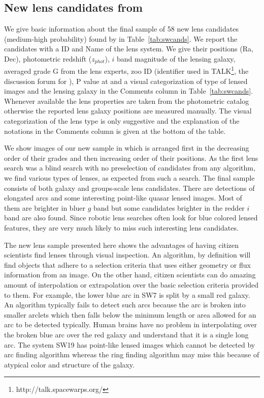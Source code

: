 \documentclass[useAMS,usenatbib,a4paper]{mn2e}
\begin{document}

\subsection{New lens candidates from \sw}
\label{sec:results:newcand}

We give basic information about the final sample of 58 new lens
candidates (medium-high probability) found by \sw in
Table~\ref{tab:swcands}. We report the candidates with a \sw ID and Name of the
lens system. We give their positions (Ra, Dec), photometric redshift
($z_{phot}$), $i$ band magnitude of the lensing galaxy, averaged grade G from
the lens experts, zoo ID (identifier used in
TALK\footnote{http://talk.spacewarps.org/}, the discussion forum for \sw), P
value at \StageTwo and a visual categorization of type of lensed images and the
lensing galaxy in the Comments column in Table~\ref{tab:swcands}. Whenever
available the lens properties are taken from the \cfhtls photometric catalog
\citep{Coupon2009} otherwise the reported lens galaxy positions are measured
manually. The visual categorization of the lens type is only suggestive and the
explanation of the notations in the Comments column is given at the bottom of
the table.

We show images of our new sample in  which is arranged
first in the decreasing order of their grades and then increasing order
of their positions. As the first lens search was a blind search with no
preselection of candidates from any algorithm, we find various types of
lenses, as expected from such a search. The final sample consists of both
galaxy and groups-scale lens candidates. There are detections of
elongated arcs and some interesting point-like quasar lensed images.
Most of them are brighter in bluer $g$ band but some candidates brighter
in the redder $i$ band are also found. Since robotic lens searches
often look for blue colored lensed features, they are very much likely
to miss such interesting lens candidates. 

The new \sw lens sample presented here shows the advantages of having
citizen scientists find lenses through visual inspection. An algorithm,
by definition will find objects that adhere to a selection criteria that
uses either geometry or flux information from an image. On the other
hand, citizen scientists can do amazing amount of interpolation or
extrapolation over the basic selection criteria provided to them. 
For example,  the lower blue arc in SW7 is split by a small red galaxy.
An algorithm typically fails to detect such arcs because the arc is
broken into smaller arclets which then falls below the minimum length or
area allowed for an arc to be detected typically. Human brains have no
problem in interpolating over the broken blue arc over the red galaxy
and understand that it is a single long arc. The system SW19 has
point-like lensed images which cannot be detected by arc finding
algorithm whereas the ring finding algorithm may miss this because of
atypical color and structure of the galaxy. 
\end{document}
